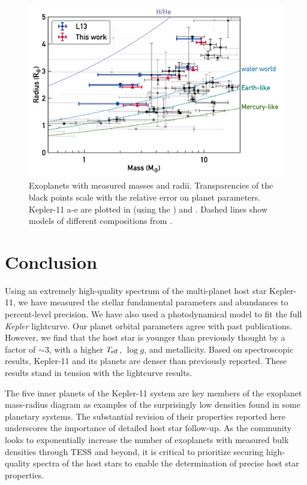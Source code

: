 \documentclass[twocolumn,trackchanges]{aastex61}
\newcommand{\teff}{$T_{\rm eff}$}
\newcommand{\logg}{$\log g$}
\newcommand{\Kepler}{\textit{Kepler} }
\begin{document}
\begin{figure}
\centering
\includegraphics[scale=0.6]{K11_massradius}
\caption{Exoplanets with measured masses and radii. Transparencies of the black points scale with the relative error on planet parameters. Kepler-11 a-e are plotted in  (using the ) and  . Dashed lines show models of different compositions from \citet{Seager2007}.}
\label{fig:mr}
\end{figure}


\section{Conclusion}

Using an extremely high-quality spectrum of the multi-planet host star Kepler-11, we have measured the stellar fundamental parameters and abundances to percent-level precision. We have also used a photodynamical model to fit the full \Kepler lightcurve. Our planet orbital parameters agree with past publications. However, we find that the host star is younger than previously thought by a factor of $\sim$3, with a higher \teff, \logg, and metallicity. Based on spectroscopic results, Kepler-11 and its planets are  denser than previously reported. These results stand in tension with the lightcurve results.

The five inner planets of the Kepler-11 system are key members of the exoplanet mass-radius diagram as examples of the surprisingly low densities found in some planetary systems. The substantial revision of their properties reported here underscores the importance of detailed host star follow-up. As the community looks to exponentially increase the number of exoplanets with measured bulk densities through TESS and beyond, it is critical to prioritize securing high-quality spectra of the host stars to enable the determination of precise host star properties.
\end{document}
